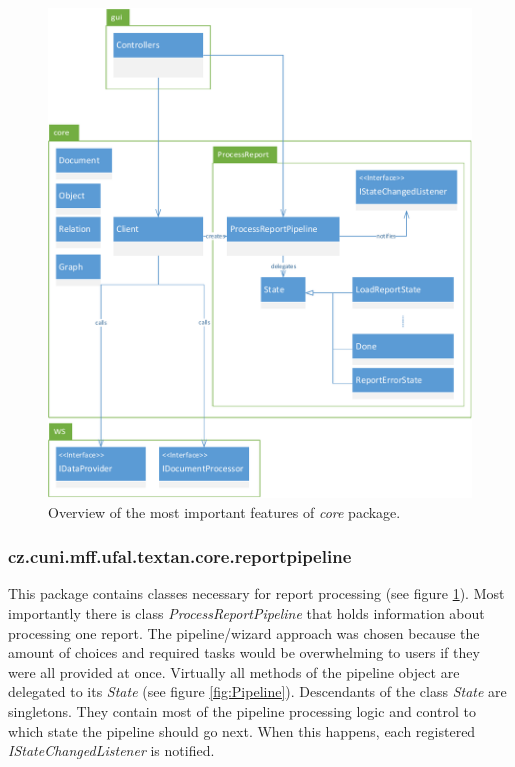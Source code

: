 \begin{figure}[!htb]
        \centering
        \includegraphics[width=\textwidth]{Images/CorePackage}
        \caption{Overview of the most important features of \emph{core} package.}
        \label{fig:CorePackage}
\end{figure}

\subsubsection{cz.cuni.mff.ufal.textan.core.reportpipeline}
\label{sssec:ReportPipeline}

This package contains classes necessary for report processing (see figure
\ref{fig:CorePackage}). Most importantly there is class
\emph{ProcessReportPipeline} that holds information about processing one report.
The pipeline/wizard approach was chosen because the amount of choices and
required tasks would be overwhelming to users if they were all provided at once.
Virtually all methods of the pipeline object are delegated to its \emph{State}
(see figure \ref{fig:Pipeline}). Descendants of the class \emph{State} are
singletons. They contain most of the pipeline processing logic and control to
which state the pipeline should go next. When this happens, each registered
\emph{IStateChangedListener} is notified.

